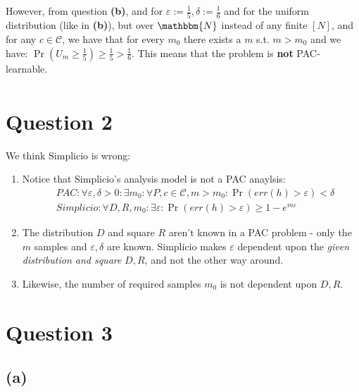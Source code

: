 \documentclass[a4paper]{article}
\renewcommand{\epsilon}{\varepsilon}
\newcommand{\N}{\mathbbm{N}}
\newcommand{\qedsquare}{\tag*{$\square$}}
\begin{document}
However, from question \textbf{(b)}, and for $ \epsilon := \frac{1}{5}, \delta := \frac{1}{6} $ and for the uniform distribution
(like in \textbf{(b)}), but over $\N$ instead of any finite $[N]$, and for any $ c \in \mathcal{C} $,
we have that for every $m_0$ there exists a $m$ s.t. $m>m_0$ and we have:
$ \Pr(U_m \geq \frac{1}{5}) \geq \frac{1}{5} > \frac{1}{6} $.
This means that the problem is \textbf{not} PAC-learnable.
\begin{align*}\qedsquare\end{align*}

\newpage

\section {Question 2}

We think Simplicio is wrong:

\begin{enumerate}
    \item Notice that Simplicio's analysis model is not a PAC anaylsis:
        \begin{align*}
            &PAC: \forall \epsilon , \delta > 0 : \exists m_0 : \forall P, c\in\mathcal{C}, m>m_0
            : \Pr( err(h) > \epsilon ) <\delta \\
            &Simplicio: \forall D, R, m_0 : \exists \epsilon : \Pr( err(h) > \epsilon ) \geq 1 - e^{m\epsilon}
        \end{align*}

    \item The distribution $D$ and square $R$ aren't known in a PAC problem -
        only the $m$ samples and $\epsilon,\delta$ are known.
        Simplicio makes $\epsilon$ dependent upon the \textit{given distribution and square} $D,R$, and not the other way around.

    \item Likewise, the number of required samples $m_0$ is not dependent upon $D,R$.
\end{enumerate}

\section {Question 3}

\subsection {(a)}
\end{document}
